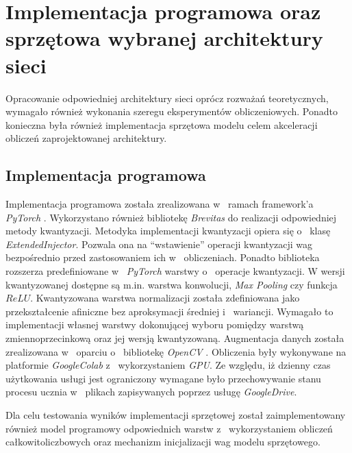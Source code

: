 \chapter{Implementacja programowa oraz sprzętowa wybranej architektury sieci}
\label{cha:Implementacja}

Opracowanie odpowiedniej architektury sieci oprócz rozważań teoretycznych, wymagało również wykonania szeregu eksperymentów obliczeniowych.
Ponadto konieczna była również implementacja sprzętowa modelu celem akceleracji obliczeń zaprojektowanej architektury.

\section{Implementacja programowa}

Implementacja programowa została zrealizowana w~ ramach framework'a \emph{PyTorch} \cite{pytorch}.
Wykorzystano również bibliotekę \emph{Brevitas} \cite{brevitas} do realizacji odpowiedniej metody kwantyzacji.
Metodyka implementacji kwantyzacji opiera się o~ klasę \emph{ExtendedInjector}.
Pozwala ona na ``wstawienie'' operacji kwantyzacji wag bezpośrednio przed zastosowaniem ich w~ obliczeniach.
Ponadto biblioteka rozszerza predefiniowane w~ \emph{PyTorch} warstwy o~ operacje kwantyzacji. 
W wersji kwantyzowanej dostępne są m.in. warstwa konwolucji, \emph{Max Pooling} czy funkcja $ReLU$.
Kwantyzowana warstwa normalizacji została zdefiniowana jako przekształcenie afiniczne bez aproksymacji średniej i~ wariancji.
Wymagało to implementacji własnej warstwy dokonującej wyboru pomiędzy warstwą zmiennoprzecinkową oraz jej wersją kwantyzowaną.
Augmentacja danych została zrealizowana w~ oparciu o~ bibliotekę \emph{OpenCV} \cite{opencv}.
Obliczenia były wykonywane na platformie \emph{GoogleColab} \cite{colab} z~ wykorzystaniem \emph{GPU}.
Ze względu, iż dzienny czas użytkowania usługi jest ograniczony wymagane było przechowywanie stanu procesu ucznia w~ plikach zapisywanych poprzez usługę \emph{GoogleDrive}.

Dla celu testowania wyników implementacji sprzętowej został zaimplementowany również model programowy odpowiednich warstw z~ wykorzystaniem obliczeń całkowitoliczbowych oraz mechanizm inicjalizacji wag modelu sprzętowego.


